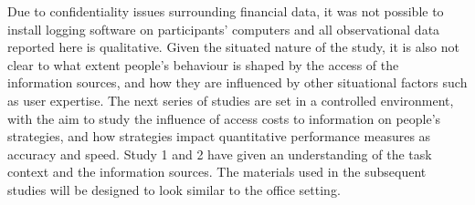 Due to confidentiality issues surrounding financial data, it was not possible to install logging software on participants' computers and all observational data reported here is qualitative. 
Given the situated nature of the study, it is also not clear to what extent people's behaviour is shaped by the access of the information sources, and how they are influenced by other situational factors such as user expertise. 
The next series of studies are set in a controlled environment, with the aim to study the influence of access costs to information on people's strategies, and how strategies impact quantitative performance measures as accuracy and speed. Study 1 and 2 have given an understanding of the task context and the information sources. The materials used in the subsequent studies will be designed to look similar to the office setting.
